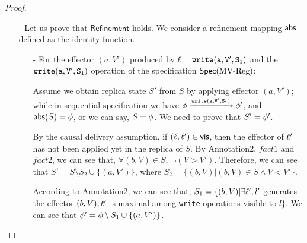 \begin {proof}
\begin{itemize}
\begin{itemize}
    \item[-] For case when replica $\arep$ apply effector $(a,V')$ of a {\tt write} operation $\alabel$ originated in a different replica: We only need to prove Annotation2. Let $S$ and $S'$ be the replica state of replica $\arep$ of $\aglobalstate$ and $\aglobalstate'$, respectively.

        By the causal delivery assumption, if $\alabel$ is visible to an operation $\alabel'$, then the effector of $\alabel'$ has not been applied in $\aglobalstate'$ yet. By Annotation2, $fact1$ and $fact2$, we know that, $\forall (b,V) \in S$, we have $\neg(V > V')$. Therefore, we have $S' = S \setminus \{ (b,V) \vert (b,V) \in S \wedge V < V' \} \cup \{ (a,V') \}$. By $fact1$ and $fact2$, each element in $\{ (b,V) \vert (b,V) \in S \wedge V < V' \}$ is visible to $\alabel$, and they are not in $S'$. Therefore, Annotation2 still holds in $\aglobalstate'$.
    \end{itemize}

\item[-] Let us prove that $\mathsf{Refinement}$ holds. We consider a refinement mapping $\mathsf{abs}$ defined as the identity function.

    \begin{itemize}
    \setlength{\itemsep}{0.5pt}
    \item[-] For the effector $(a,V')$ produced by $\alabel = \alabelshort[{\tt write}]{a,V',S_1}$ and the $\alabelshort[{\tt write}]{a,V',S_1}$ operation of the specification $\mathsf{Spec}(\text{MV\text{-}Reg})$:


    Assume we obtain replica state $S'$ from $S$ by applying effector $(a,V')$; while in sequential specification we have $\abstate \xrightarrow{\alabelshort[{\tt write}]{a,V',S_1}} \abstate'$, and $\mathsf{abs}(S) = \phi$, or we can say, $S = \phi$. We need to prove that $S' = \phi'$.

    By the causal delivery assumption, if $(\ell,\ell') \in \mathsf{vis}$, then the effector of $\alabel'$ has not been applied yet in the replica of $S$. By Annotation2, $fact1$ and $fact2$, we can see that, $\forall (b,V) \in S$, $\neg(V > V')$. Therefore, we can see that $S' = S \setminus S_2 \cup \{ (a,V') \}$, where $S_2 = \{ (b,V) \vert (b,V) \in S \wedge V < V' \}$.

    According to Annotation2, we can see that, $S_1 = \{ (b,V) \vert \exists \ell', l'$ generates the effector $(b,V), \ell'$ is maximal among {\tt write} operations visible to $l \}$. We can see that $\phi' = \phi \setminus S_1 \cup \{ (a,V') \}$.


\end{itemize}
\end{itemize}
\end{proof}
